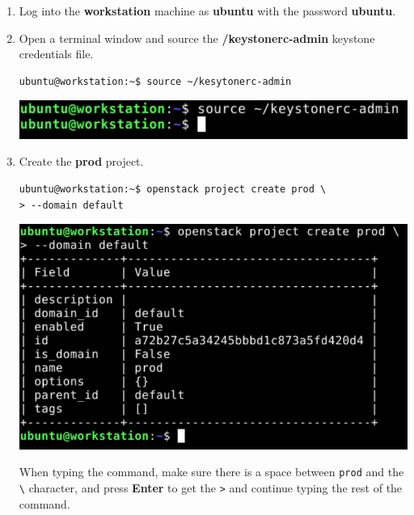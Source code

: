\documentclass[letterpaper, 12pt]{article}
\begin{document}
\begin{enumerate}
    \item Log into the \textbf{workstation} machine as \textbf{ubuntu} with the password \textbf{ubuntu}.

    \item Open a terminal window and source the \textbf{\texttildemid/keystonerc-admin} keystone credentials file.
\begin{lstlisting}
ubuntu@workstation:~$ source ~/kesytonerc-admin
\end{lstlisting}

    \begin{center}
        \includegraphics[width=\linewidth]{images/part1/step2.png}
    \end{center}

    \item Create the \textbf{prod} project.
\begin{lstlisting}
ubuntu@workstation:~$ openstack project create prod \
> --domain default
\end{lstlisting}

    \begin{center}
        \includegraphics[width=\linewidth]{images/part1/step3.png}
    \end{center}

\begin{tipbox}{}
    When typing the command, make sure there is a space between \texttt{prod} and the \texttt{\textbackslash}
    character, and press \textbf{Enter} to get the \texttt{>} and continue typing the rest of the command.
\end{tipbox}


\end{enumerate}
\end{document}
